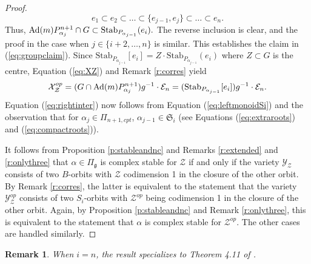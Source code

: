 \documentclass[12pt]{amsart}
\numberwithin{equation}{section}
\newtheorem{rem}[thm]{Remark}
\newcommand{\cZ}{{\mathcal Z}}
\newcommand{\fg}{\mbox{${\mathfrak g}$}}
\newcommand{\Ad}{{\rm Ad}}
\newcommand{\B}{\mathcal{B}}
\begin{document}
\begin{proof}
 $$
 e_{1}\subset e_{2}\subset\dots\subset \{e_{j-1},e_{j}\}\subset \dots\subset e_{n}.  
 $$
Thus, $\Ad(m)P_{\alpha_{j}}^{n+1}\cap G\subset \mbox{Stab}_{P_{\alpha_{j-1}}}(e_{i}).$  The reverse inclusion is clear, and the proof in the case when $j\in \{i+2,\dots ,n\}$ is similar.  This establishes the claim in (\ref{eq:groupclaim}).  Since $\mbox{Stab}_{P_{\alpha_{j-1}}}[e_{i}]=Z\cdot \mbox{Stab}_{P_{\alpha_{j-1}}}(e_{i})$ where $Z\subset G$ is the centre, Equation (\ref{eq:XZ}) and Remark \ref{r:corres} yield
$$
\mathcal{X}_{\cZ}^{op}=(G\cap \Ad(m)P_{\alpha_{j}}^{n+1}) g^{-1}\cdot\mathcal{E}_{n}=(\mbox{Stab}_{P_{\alpha_{j-1}}}[e_{i}])g^{-1}\cdot \mathcal{E}_{n}.
$$  
Equation (\ref{eq:rightinter}) now follows from Equation (\ref{eq:leftmonoidSi}) and the observation that for $\alpha_{j}\in \Pi_{n+1, cpt}$, $\alpha_{j-1}\in\mathfrak{S}_{i}$ (see Equations (\ref{eq:extraroots}) and (\ref{eq:compactroots})).


It follows from Proposition \ref{p:stableandnc} and Remarks \ref{r:extended} and \ref{r:onlythree} that $\alpha\in\Pi_{\fg}$ is complex stable for $\cZ$ if and only if the variety $\mathcal{Y}_{\cZ}$ consists of two $B$-orbits with $\cZ$ codimension 1 in the closure of the other orbit.  By Remark \ref{r:corres}, the latter is equivalent to the statement that the variety $\mathcal{Y}_{\cZ}^{op}$ consists of two $S_{i}$-orbits with $\cZ^{op}$ being codimension 1 in the closure of the other orbit.  Again, by Proposition \ref{p:stableandnc} and Remark \ref{r:onlythree}, this is equivalent to the statement that $\alpha$ is complex stable for $\cZ^{op}$.  The other cases are handled similarly. 





\end{proof}

\begin{rem}
When $i=n$, %
 the result specializes to Theorem 4.11 of \cite{CE21I}.
\end{rem}
\end{document}
